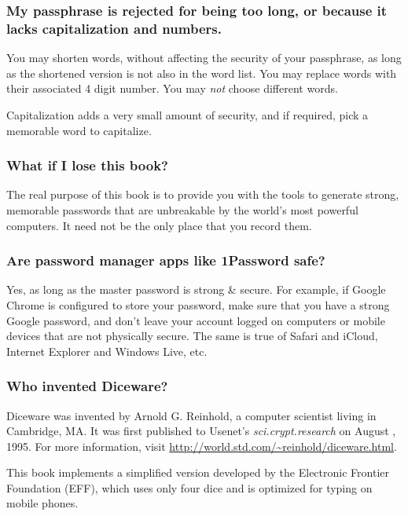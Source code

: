 \subsubsection{My passphrase is rejected for being too long, or because it lacks capitalization and numbers.}

You may shorten words, without affecting the security of your passphrase, as long as the shortened version is not also in the word list. You may replace words with their associated 4 digit number. You may \textit{not} choose different words.
 
Capitalization adds a very small amount of security, and if required, pick a memorable word to capitalize.

\subsubsection{What if I lose this book?}

The real purpose of this book is to provide you with the tools to generate strong, memorable passwords that are unbreakable by the world's most powerful computers. It need not be the only place that you record them.

\subsubsection{Are password manager apps like 1Password safe?}

Yes, as long as the master password is strong \& secure. For example, if Google Chrome is configured to store your password, make sure that you have a strong Google password, and don't leave your account logged on computers or mobile devices that are not physically secure. The same is true of Safari and iCloud, Internet Explorer and Windows Live, etc.

\subsubsection{Who invented Diceware?}

Diceware was invented by Arnold G. Reinhold, a computer scientist living in Cambridge, MA. It was first published to Usenet's \textit{sci.crypt.research} on August , 1995. For more information, visit \url{http://world.std.com/~reinhold/diceware.html}. 

This book implements a simplified version developed by the Electronic Frontier Foundation (EFF), which uses only four dice and is optimized for typing on mobile phones.
 
